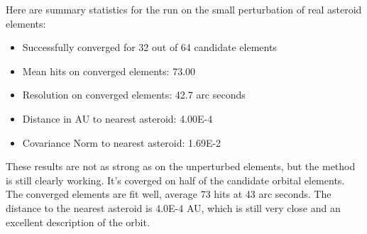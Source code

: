 Here are summary statistics for the run on the small perturbation of real asteroid elements:
\begin{itemize}
\item Successfully converged for 32 out of 64 candidate elements
\item Mean hits on converged elements: 73.00
\item Resolution on converged elements: 42.7 arc seconds
\item Distance in AU to nearest asteroid: 4.00E-4
\item Covariance Norm to nearest asteroid: 1.69E-2
\end{itemize}
These results are not as strong as on the unperturbed elements, but the method is still clearly working.
It's coverged on half of the candidate orbital elements.
The converged elements are fit well, average 73 hits at 43 arc seconds.
The distance to the nearest asteroid is 4.0E-4 AU, which is still very close and an excellent description of the orbit.

